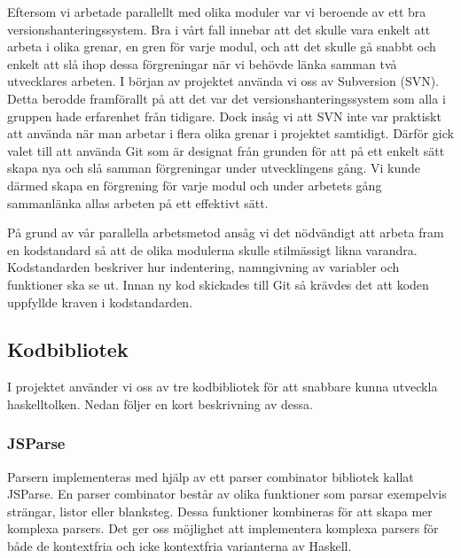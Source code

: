 Eftersom vi arbetade parallellt med olika moduler var vi beroende av ett bra versionshanteringssystem. Bra i vårt fall innebar att det skulle vara enkelt att arbeta i olika grenar, en gren för varje modul, och att det skulle gå snabbt och enkelt att slå ihop dessa förgreningar när vi behövde länka samman två utvecklares arbeten. I början av projektet använda vi oss av Subversion (SVN). Detta berodde framförallt på att det var det versionshanteringssystem som alla i gruppen hade erfarenhet från tidigare. Dock insåg vi att SVN inte var praktiskt att använda när man arbetar i flera olika grenar i projektet samtidigt. Därför gick valet till att använda Git som är designat från grunden för att på ett enkelt sätt skapa nya och slå samman förgreningar under utvecklingens gång. Vi kunde därmed skapa en förgrening för varje modul och under arbetets gång sammanlänka allas arbeten på ett effektivt sätt. 

På grund av vår parallella arbetsmetod ansåg vi det nödvändigt att arbeta fram en kodstandard så att de olika modulerna skulle stilmässigt likna varandra. Kodstandarden beskriver hur indentering, namngivning av variabler och funktioner ska se ut. Innan ny kod skickades till Git så krävdes det att koden uppfyllde kraven i kodstandarden.  


\subsection{Kodbibliotek}
I projektet använder vi oss av tre kodbibliotek för att snabbare kunna utveckla haskelltolken. Nedan följer en kort beskrivning av dessa.

\subsubsection{JSParse}  
Parsern implementeras med hjälp av ett parser combinator bibliotek kallat JSParse. 
En parser combinator består av olika funktioner som parsar exempelvis strängar, listor eller blanksteg.
Dessa funktioner kombineras för att skapa mer komplexa parsers. Det ger oss möjlighet att implementera komplexa
parsers för både de kontextfria och icke kontextfria varianterna av Haskell.

